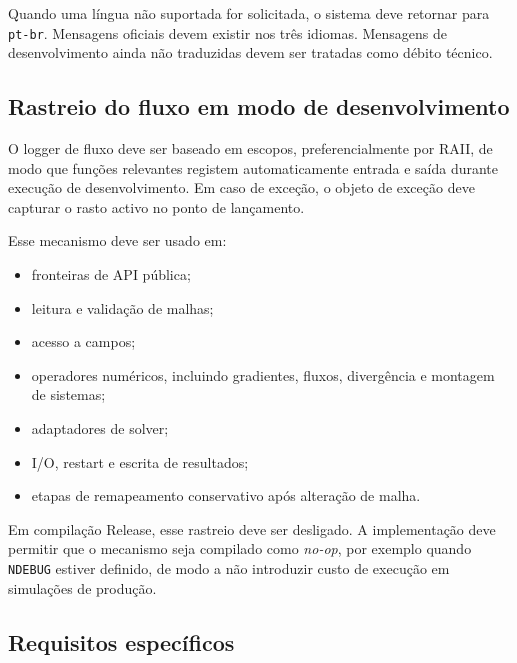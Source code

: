 \documentclass[11pt,a4paper]{article}
\begin{document}
Quando uma l\'ingua n\~ao suportada for solicitada, o sistema deve retornar para \texttt{pt-br}. Mensagens oficiais devem existir nos tr\^es idiomas. Mensagens de desenvolvimento ainda n\~ao traduzidas devem ser tratadas como d\'ebito t\'ecnico.

\subsection{Rastreio do fluxo em modo de desenvolvimento}

O logger de fluxo deve ser baseado em escopos, preferencialmente por RAII, de modo que fun\c{c}\~oes relevantes registem automaticamente entrada e sa\'ida durante execu\c{c}\~ao de desenvolvimento. Em caso de exce\c{c}\~ao, o objeto de exce\c{c}\~ao deve capturar o rasto activo no ponto de lan\c{c}amento.

Esse mecanismo deve ser usado em:
\begin{itemize}
  \item fronteiras de API p\'ublica;
  \item leitura e valida\c{c}\~ao de malhas;
  \item acesso a campos;
  \item operadores num\'ericos, incluindo gradientes, fluxos, diverg\^encia e montagem de sistemas;
  \item adaptadores de solver;
  \item I/O, restart e escrita de resultados;
  \item etapas de remapeamento conservativo ap\'os altera\c{c}\~ao de malha.
\end{itemize}

Em compila\c{c}\~ao Release, esse rastreio deve ser desligado. A implementa\c{c}\~ao deve permitir que o mecanismo seja compilado como \textit{no-op}, por exemplo quando \texttt{NDEBUG} estiver definido, de modo a n\~ao introduzir custo de execu\c{c}\~ao em simula\c{c}\~oes de produ\c{c}\~ao.

\subsection{Requisitos espec\'ificos}
\end{document}
